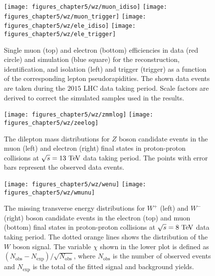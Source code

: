 \begin{figure}[h]
\centering
\texttt{[image: figures\_chapter5/wz/muon\_idiso]}
\texttt{[image: figures\_chapter5/wz/muon\_trigger]}
\texttt{[image: figures\_chapter5/wz/ele\_idiso]}
\texttt{[image: figures\_chapter5/wz/ele\_trigger]}
\caption{Single muon (top) and electron (bottom) efficiencies in data (red circle) and simulation (blue square) for the reconstruction, identification, and isolation (left) and trigger (trigger) as a function of the corresponding lepton pseudorapidities. The shown data events are taken during the $2015$ LHC data taking period. Scale factors are derived to correct the simulated samples used in the results.}
\label{fig:scale}
\end{figure}



\begin{figure}[h]
\centering
\texttt{[image: figures\_chapter5/wz/zmmlog]}
\texttt{[image: figures\_chapter5/wz/zeelog]}
\caption{The dilepton mass distributions for $Z$ boson candidate events in the muon (left) and electron (right) final states in proton-proton collisions at $\sqrt{s}=13~\mathrm{Te\kern -0.1em V}$ data taking period. The points with error bars represent the observed data events.
\label{fig:z13}}
\end{figure}

\begin{figure}[h]
\centering
        \texttt{[image: figures\_chapter5/wz/wenu]}
        \texttt{[image: figures\_chapter5/wz/wmunu]}
       \caption{The missing transverse energy distributions for
         $W^+$  (left) and $W^-$  (right) boson candidate events in the electron (top)
       and muon (bottom) final states in proton-proton collisions at $\sqrt{s}=8~\mathrm{Te\kern -0.1em V}$ data taking period. The dotted orange lines shows the distribution of the $W$ boson signal. The variable $\chi$ shown in the lower plot is defined as $(N_{\text{obs}}-N_{\text{exp}})/\sqrt{N_{\text{obs}}}$, where $N_{\text{obs}}$ is the number of observed events and $N_{\text{exp}}$ is the total of the fitted signal and background yields.
       \label{fig:W8}}
\end{figure}



